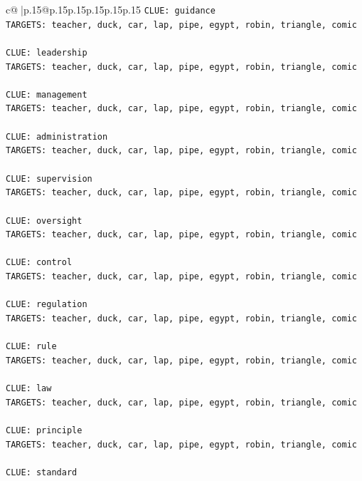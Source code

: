 \documentclass{article}
\begin{document}
{\begin{supertabular}{c@{$\;$}|p{.15\linewidth}@{}p{.15\linewidth}p{.15\linewidth}p{.15\linewidth}p{.15\linewidth}p{.15\linewidth}}
{{{\texttt{CLUE: guidance} \\
\texttt{TARGETS: teacher, duck, car, lap, pipe, egypt, robin, triangle, comic} \\
\\ 
\texttt{CLUE: leadership} \\
\texttt{TARGETS: teacher, duck, car, lap, pipe, egypt, robin, triangle, comic} \\
\\ 
\texttt{CLUE: management} \\
\texttt{TARGETS: teacher, duck, car, lap, pipe, egypt, robin, triangle, comic} \\
\\ 
\texttt{CLUE: administration} \\
\texttt{TARGETS: teacher, duck, car, lap, pipe, egypt, robin, triangle, comic} \\
\\ 
\texttt{CLUE: supervision} \\
\texttt{TARGETS: teacher, duck, car, lap, pipe, egypt, robin, triangle, comic} \\
\\ 
\texttt{CLUE: oversight} \\
\texttt{TARGETS: teacher, duck, car, lap, pipe, egypt, robin, triangle, comic} \\
\\ 
\texttt{CLUE: control} \\
\texttt{TARGETS: teacher, duck, car, lap, pipe, egypt, robin, triangle, comic} \\
\\ 
\texttt{CLUE: regulation} \\
\texttt{TARGETS: teacher, duck, car, lap, pipe, egypt, robin, triangle, comic} \\
\\ 
\texttt{CLUE: rule} \\
\texttt{TARGETS: teacher, duck, car, lap, pipe, egypt, robin, triangle, comic} \\
\\ 
\texttt{CLUE: law} \\
\texttt{TARGETS: teacher, duck, car, lap, pipe, egypt, robin, triangle, comic} \\
\\ 
\texttt{CLUE: principle} \\
\texttt{TARGETS: teacher, duck, car, lap, pipe, egypt, robin, triangle, comic} \\
\\ 
\texttt{CLUE: standard} \\
}}}
\end{supertabular}}
\end{document}
